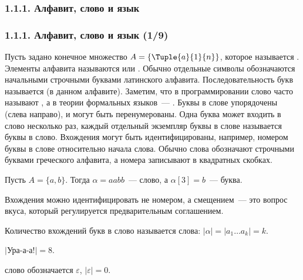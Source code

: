 \subsubsection{1.1.1. Алфавит, слово и язык}\label{1.1.1}
\begin{frame}
\frametitle{1.1.1. Алфавит, слово и язык (1/9)}
Пусть задано конечное множество $A =\{\Tuple{a}{1}{n}\}$, которое
называется . Элементы алфавита называются
 или .
Обычно отдельные символы обозначаются
начальными строчными буквами латинского алфавита.
Последовательность букв называется
 (в данном алфавите).
Заметим, что в программировании слово часто называют
, а в теории формальных языков~--- .
Буквы в слове упорядочены (слева направо),
и могут быть перенумерованы.
Одна буква может входить
в слово несколько раз, каждый
отдельный экземпляр буквы в слове называется
 буквы в слово.
Вхождения могут быть идентифицированы,
например, номером буквы в слове 
 относительно начала слова.
Обычно слова обозначают
строчными буквами греческого алфавита,
а номера записывают в квадратных скобках.
\begin{example}
Пусть $A=\{a,b\}$. Тогда 
$\alpha=aabb$~--- слово, 
а $\alpha[3]=b$~--- буква.
\end{example}

\begin{remark}
Вхождения можно идентифицировать не номером,
а смещением~--- это вопрос вкуса, который регулируется предварительным соглашением.
\end{remark}

Количество вхождений букв в слово называется  слова:
$|\alpha| = |a_1\dots a_k| = k$.
\begin{example} $|$Ура-а-а!$| = 8$.
\end{example}

 слово обозначается
$\varepsilon$,
$|\varepsilon|= 0$.

\end{frame}


